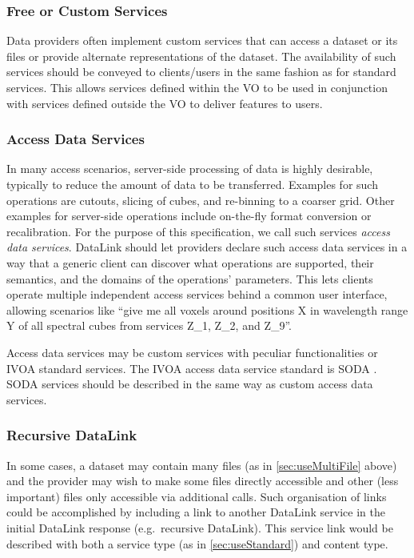 \documentclass[11pt,a4paper]{ivoa}
\begin{document}
\subsubsection{Free or Custom Services}
\label{sec:useCustom}

Data providers often implement custom services that can access a dataset
or its files or provide alternate representations of the dataset. The
availability of such services should be conveyed to clients/users in
the same fashion as for standard services. This allows services defined
within the VO to be used in conjunction with services defined outside
the VO to deliver features to users.


\subsubsection{Access Data Services}

In many access scenarios, server-side processing of data is
highly desirable, typically to reduce the amount of data to be
transferred. Examples for such operations are cutouts, slicing of
cubes, and re-binning to a coarser grid. Other examples for server-side
operations include on-the-fly format conversion or recalibration. For
the purpose of this specification, we call such services
{\em access data services}.
DataLink should let providers declare such access data services
in a way that a generic client can discover what operations are supported,
their semantics, and the domains of the operations' parameters. This lets
clients operate multiple independent access services behind a common user
interface, allowing scenarios like ``give me all voxels around positions
X in wavelength range Y of all spectral cubes from services Z\_1, Z\_2,
and Z\_9''.

Access data services may be custom services with peculiar functionalities 
or IVOA standard services. The IVOA access data service standard is
SODA \citep{2017ivoa.spec.0517B}.
SODA services should  be described in the same
way as custom access data services.

\subsubsection{Recursive DataLink}

In some cases, a dataset may contain many files
(as in \ref{sec:useMultiFile} above)
and the provider may wish to make some files directly accessible and
other (less important) files only accessible via additional calls. Such
organisation of links could be accomplished by including a link to
another DataLink service in the initial DataLink response (e.g.\ recursive
DataLink). This service link would be described with both a service type
(as in \ref{sec:useStandard}) and content type.
\end{document}
